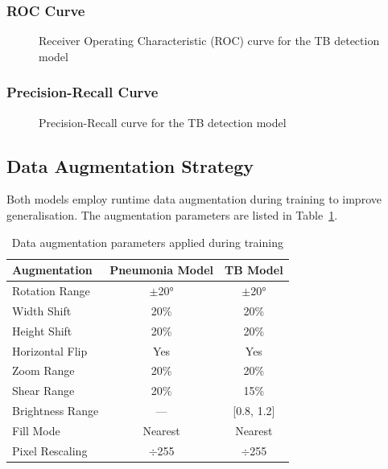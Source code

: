 \documentclass[12pt, a4paper, oneside]{report}
\begin{document}
\subsubsection{ROC Curve}

\begin{figure}[H]
\centering
{}
\caption{Receiver Operating Characteristic (ROC) curve for the TB detection model}
\label{fig:roc_curve}
\end{figure}

\subsubsection{Precision-Recall Curve}

\begin{figure}[H]
\centering
{}
\caption{Precision-Recall curve for the TB detection model}
\label{fig:pr_curve}
\end{figure}

\subsection{Data Augmentation Strategy}

Both models employ runtime data augmentation during training to improve generalisation. The augmentation parameters are listed in Table~\ref{tab:augmentation}.

\begin{table}[H]
\centering
\caption{Data augmentation parameters applied during training}
\label{tab:augmentation}
\begin{tabular}{lcc}
\toprule
\textbf{Augmentation} & \textbf{Pneumonia Model} & \textbf{TB Model} \\
\midrule
Rotation Range & $\pm$20° & $\pm$20° \\
Width Shift & 20\% & 20\% \\
Height Shift & 20\% & 20\% \\
Horizontal Flip & Yes & Yes \\
Zoom Range & 20\% & 20\% \\
Shear Range & 20\% & 15\% \\
Brightness Range & --- & [0.8, 1.2] \\
Fill Mode & Nearest & Nearest \\
Pixel Rescaling & $\div$255 & $\div$255 \\
\bottomrule
\end{tabular}
\end{table}
\end{document}
